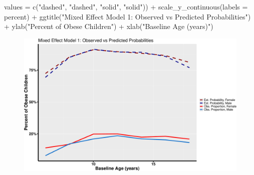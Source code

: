 \documentclass[
  letterpaper,
  DIV=11,
  numbers=noendperiod]{scrreprt}
\newenvironment{Shaded}{\begin{snugshade}}{\end{snugshade}}
\newcommand{\AttributeTok}[1]{\textcolor[rgb]{0.40,0.45,0.13}{#1}}
\newcommand{\FunctionTok}[1]{\textcolor[rgb]{0.28,0.35,0.67}{#1}}
\newcommand{\NormalTok}[1]{\textcolor[rgb]{0.00,0.23,0.31}{#1}}
\newcommand{\SpecialCharTok}[1]{\textcolor[rgb]{0.37,0.37,0.37}{#1}}
\newcommand{\StringTok}[1]{\textcolor[rgb]{0.13,0.47,0.30}{#1}}
\begin{document}
\begin{Shaded}
\begin{Highlighting}[]
    \AttributeTok{values =} \FunctionTok{c}\NormalTok{(}\StringTok{"dashed"}\NormalTok{, }\StringTok{"dashed"}\NormalTok{, }\StringTok{"solid"}\NormalTok{, }\StringTok{"solid"}\NormalTok{)) }\SpecialCharTok{+} \FunctionTok{scale\_y\_continuous}\NormalTok{(}\AttributeTok{labels =}\NormalTok{ percent) }\SpecialCharTok{+}
    \FunctionTok{ggtitle}\NormalTok{(}\StringTok{"Mixed Effect Model 1: Observed vs Predicted Probabilities"}\NormalTok{) }\SpecialCharTok{+} \FunctionTok{ylab}\NormalTok{(}\StringTok{"Percent of Obese Children"}\NormalTok{) }\SpecialCharTok{+}
    \FunctionTok{xlab}\NormalTok{(}\StringTok{"Baseline Age (years)"}\NormalTok{)}
\end{Highlighting}
\end{Shaded}

\begin{figure}[H]

{\centering \includegraphics{Longi_noncontinuous_files/figure-pdf/unnamed-chunk-23-1.pdf}

}

\end{figure}
\end{document}
